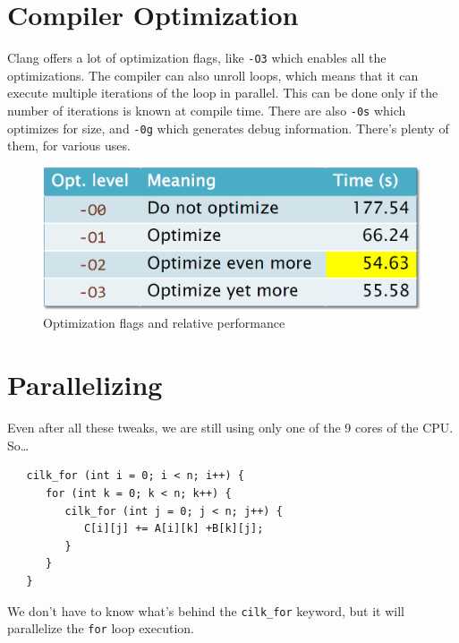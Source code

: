 \section{Compiler Optimization}
\begin{paracol}{2}
   \colfill
   Clang offers a lot of optimization flags, like \texttt{-O3} which enables all the optimizations. The compiler can also unroll loops, which means that it can execute multiple iterations of the loop in parallel. This can be done only if the number of iterations is known at compile time.
   There are also \texttt{-0s} which optimizes for size, and \texttt{-0g} which generates debug information. There's plenty of them, for various uses.
   \colfill
   
   \switchcolumn
   \begin{figure}[htbp]
      \centering
      \includegraphics{images/02/optimization.png}
      \caption{Optimization flags and relative performance}
      \label{fig:optimization}
   \end{figure}
\end{paracol}

\section{Parallelizing}
Even after all these tweaks, we are still using only one of the 9 cores of the CPU.
So\dots
\begin{lstlisting}
   cilk_for (int i = 0; i < n; i++) {
      for (int k = 0; k < n; k++) {
         cilk_for (int j = 0; j < n; j++) {
            C[i][j] += A[i][k] +B[k][j];
         }
      }
   }
\end{lstlisting}
We don't have to know what's behind the \texttt{cilk\_for} keyword, but it will parallelize the \texttt{for} loop execution.


